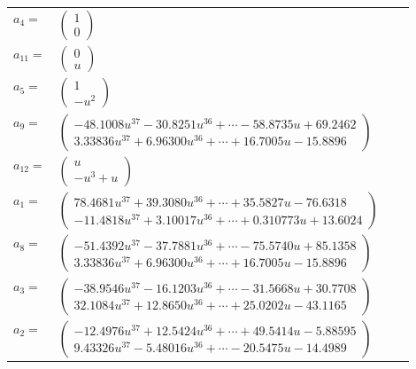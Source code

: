 \documentclass[1p]{elsarticle_modified}
\theoremstyle{definition}
\begin{document}
\begin{tabular}{m{7pt} m{180pt} m{7pt} m{180pt} }
\flushright $a_{4}=$&$\begin{pmatrix}1\\0\end{pmatrix}$ \\
\flushright $a_{11}=$&$\begin{pmatrix}0\\u\end{pmatrix}$ \\
\flushright $a_{5}=$&$\begin{pmatrix}1\\- u^2\end{pmatrix}$ \\
\flushright $a_{9}=$&$\begin{pmatrix}-48.1008 u^{37}-30.8251 u^{36}+\cdots-58.8735 u+69.2462\\3.33836 u^{37}+6.96300 u^{36}+\cdots+16.7005 u-15.8896\end{pmatrix}$ \\
\flushright $a_{12}=$&$\begin{pmatrix}u\\- u^3+u\end{pmatrix}$ \\
\flushright $a_{1}=$&$\begin{pmatrix}78.4681 u^{37}+39.3080 u^{36}+\cdots+35.5827 u-76.6318\\-11.4818 u^{37}+3.10017 u^{36}+\cdots+0.310773 u+13.6024\end{pmatrix}$ \\
\flushright $a_{8}=$&$\begin{pmatrix}-51.4392 u^{37}-37.7881 u^{36}+\cdots-75.5740 u+85.1358\\3.33836 u^{37}+6.96300 u^{36}+\cdots+16.7005 u-15.8896\end{pmatrix}$ \\
\flushright $a_{3}=$&$\begin{pmatrix}-38.9546 u^{37}-16.1203 u^{36}+\cdots-31.5668 u+30.7708\\32.1084 u^{37}+12.8650 u^{36}+\cdots+25.0202 u-43.1165\end{pmatrix}$ \\
\flushright $a_{2}=$&$\begin{pmatrix}-12.4976 u^{37}+12.5424 u^{36}+\cdots+49.5414 u-5.88595\\9.43326 u^{37}-5.48016 u^{36}+\cdots-20.5475 u-14.4989\end{pmatrix}$ \\

\end{tabular}
\end{document}
